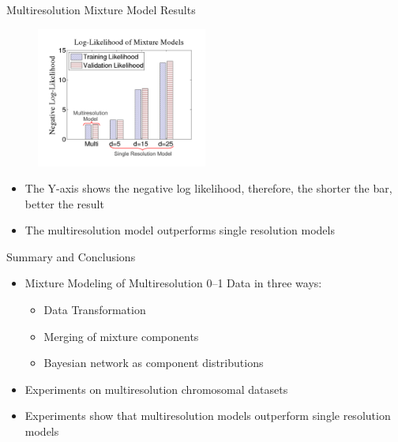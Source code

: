 \documentclass[first=dgreen,second=purple,logo=redexc]{aaltoslides}
\newcommand\FrameText[1]{%
  \begin{textblock*}{0.98\textwidth}(0.2\textwidth,0.95\textheight)
    \textcolor {blue}{\scriptsize\raggedright #1\hspace{0.1\textwidth}}
  \end{textblock*}}
\begin{document}
\begin{frame} {Multiresolution Mixture Model Results} 

      \begin{figure}
      \centering
      \includegraphics[trim=1cm 0.5cm 1cm 1cm, clip=true, width=0.5\textwidth]{figures/barlkhood}
      \end{figure}
      
      \vspace{-5mm}
      
      \begin{itemize}\setlength{\itemsep}{1mm}
      
\small
\item The Y-axis shows the negative log likelihood, therefore, the shorter the bar, better the result
\item The multiresolution model outperforms single resolution models
\end{itemize}

\end{frame}


\begin{frame}{Summary and Conclusions}

\begin{itemize} \setlength{\itemsep}{5.5mm}
 \item Mixture Modeling of Multiresolution 0--1 Data in three ways:
 \begin{itemize} \setlength{\itemsep}{4mm}
  \item Data Transformation 
  \item Merging of mixture components
  \item Bayesian network as component distributions
 \end{itemize}
 \item Experiments on multiresolution chromosomal datasets
 \item Experiments show that multiresolution models outperform single resolution models
\end{itemize}
\end{frame}
\end{document}

